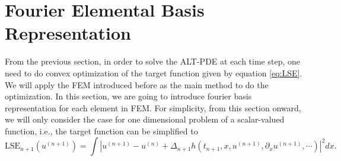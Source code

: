 \documentclass[preprint, 12pt]{revtex4-2}
\numberwithin{equation}{section}
\begin{document}
\section{Fourier Elemental Basis Representation}
From the previous section, in order to solve the ALT-PDE at each time step, one need to do convex optimization of the target function given by equation \ref{eq:LSE}. We will apply the FEM introduced before as the main method to do the optimization. In this section, we are going to introduce fourier basis representation for each element in FEM. For simplicity, from this section onward, we will only consider the case for one dimensional problem of a scalar-valued function, i.e., the target function can be simplified to
\begin{equation}\label{eq:1D scalar LSE}
    \text{LSE}_{n+1}(u^{(n+1)}) = \int \left|u^{(n+1)} - u^{(n)} + \Delta_{n+1}h(t_{n+1}, x, u^{(n+1)}, \partial_xu^{(n+1)}, \cdots)\right|^2 dx.
\end{equation}
\end{document}
